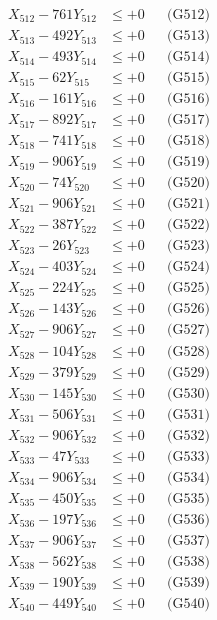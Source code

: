 \documentclass[a4paper,10pt]{article}
\begin{document}
{\begin{align}
X_{512} - 761Y_{512} &\leq +0 && \text{(G512)} \\
X_{513} - 492Y_{513} &\leq +0 && \text{(G513)} \\
X_{514} - 493Y_{514} &\leq +0 && \text{(G514)} \\
X_{515} - 62Y_{515} &\leq +0 && \text{(G515)} \\
X_{516} - 161Y_{516} &\leq +0 && \text{(G516)} \\
X_{517} - 892Y_{517} &\leq +0 && \text{(G517)} \\
X_{518} - 741Y_{518} &\leq +0 && \text{(G518)} \\
X_{519} - 906Y_{519} &\leq +0 && \text{(G519)} \\
X_{520} - 74Y_{520} &\leq +0 && \text{(G520)} \\
\allowbreak
X_{521} - 906Y_{521} &\leq +0 && \text{(G521)} \\
X_{522} - 387Y_{522} &\leq +0 && \text{(G522)} \\
X_{523} - 26Y_{523} &\leq +0 && \text{(G523)} \\
X_{524} - 403Y_{524} &\leq +0 && \text{(G524)} \\
X_{525} - 224Y_{525} &\leq +0 && \text{(G525)} \\
X_{526} - 143Y_{526} &\leq +0 && \text{(G526)} \\
X_{527} - 906Y_{527} &\leq +0 && \text{(G527)} \\
X_{528} - 104Y_{528} &\leq +0 && \text{(G528)} \\
X_{529} - 379Y_{529} &\leq +0 && \text{(G529)} \\
X_{530} - 145Y_{530} &\leq +0 && \text{(G530)} \\
\allowbreak
X_{531} - 506Y_{531} &\leq +0 && \text{(G531)} \\
X_{532} - 906Y_{532} &\leq +0 && \text{(G532)} \\
X_{533} - 47Y_{533} &\leq +0 && \text{(G533)} \\
X_{534} - 906Y_{534} &\leq +0 && \text{(G534)} \\
X_{535} - 450Y_{535} &\leq +0 && \text{(G535)} \\
X_{536} - 197Y_{536} &\leq +0 && \text{(G536)} \\
X_{537} - 906Y_{537} &\leq +0 && \text{(G537)} \\
X_{538} - 562Y_{538} &\leq +0 && \text{(G538)} \\
X_{539} - 190Y_{539} &\leq +0 && \text{(G539)} \\
X_{540} - 449Y_{540} &\leq +0 && \text{(G540)} \\

\end{align}}
\end{document}
